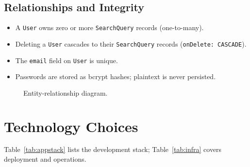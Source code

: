 \subsection{Relationships and Integrity}

\begin{itemize}[nosep]
  \item A \texttt{User} owns zero or more \texttt{SearchQuery} records
        (one-to-many).
  \item Deleting a \texttt{User} cascades to their \texttt{SearchQuery}
        records (\texttt{onDelete: CASCADE}).
  \item The \texttt{email} field on \texttt{User} is unique.
  \item Passwords are stored as bcrypt hashes; plaintext is never persisted.
\end{itemize}

\begin{figure}[ht]
\centering
{}
\caption{Entity-relationship diagram.}
\label{fig:erd}
\end{figure}

\section{Technology Choices}
\label{sec:techstack}

Table~\ref{tab:appstack} lists the development stack; Table~\ref{tab:infra}
covers deployment and operations.

